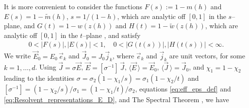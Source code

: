 \documentclass[jmp,graphicx]{revtex4-1}
\begin{document}
It is more convenient to consider the functions
$F(s):=1-m(h)$ and $E(s)=1-\tilde{m}(h)$, $s=1/(1-h)$, which are
analytic off $[0,1]$ in the $s$--plane, and $G(t)=1-w(z(h))$ and
$H(t)=1-\tilde{w}(z(h))$, which are analytic off $[0,1]$ in the
$t$--plane \cite{Bergman:PRC-377,Golden:CMP-473}, and satisfy
%
\begin{align}\label{eq:Stieltjes_Bounds}
  0<|F(s)|,|E(s)|<1, \quad 0<|G(t(s))|,|H(t(s))|<\infty.
\end{align}
%
We write
$\vec{E}_0=E_0\,\vec{e}_k$ and $\vec{J}_0=J_0\vec{j}_k$, where
$\vec{e}_k$ and $\vec{j}_k$ are unit vectors, for some
$k=1,\ldots,d$. Using $\vec{J}=\sigma\vec{E}$, $\vec{E}=[\sigma^{-1}]\,\vec{J}$,
$\langle\vec{E}\,\rangle=\vec{E}_0$, $ \langle\vec{J}\,\rangle=\vec{J}_0$, and
$\chi_1=1-\chi_2$ leading to the identities $\sigma=\sigma_2(1-\chi_1/s)=\sigma_1(1-\chi_2/t)$ and
$[\sigma^{-1}]=(1-\chi_2/s)/\sigma_1=(1-\chi_1/t)/\sigma_2$,   
equations \eqref{eq:eff_eps_def} and
\eqref{eq:Resolvent_representations_E_D}, and The Spectral Theorem  
\cite{Reed-1980}, we have \cite{Golden:CMP-473,Bergman:PRC-377}
\end{document}
